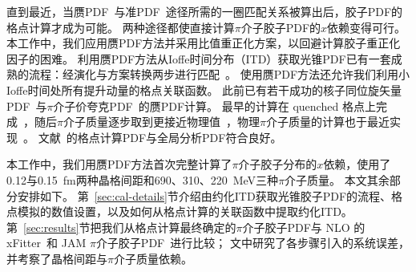 直到最近，当赝PDF~\cite{Balitsky:2019krf}与准PDF~\cite{Zhang:2018diq,Wang:2019tgg}途径所需的一圈匹配关系被算出后，胶子PDF的格点计算才成为可能。
两种途径都使直接计算$\pi$介子胶子PDF的$x$依赖变得可行。
本工作中，我们应用赝PDF方法并采用比值重正化方案，以回避计算胶子重正化因子的困难。
利用赝PDF方法从Ioffe时间分布（ITD）获取光锥PDF已有一套成熟的流程：经演化与方案转换两步进行匹配~\cite{Radyushkin:2018cvn}。
使用赝PDF方法还允许我们利用小Ioffe时间处所有提升动量的格点关联函数。
此前已有若干成功的核子同位旋矢量
PDF~\cite{Orginos:2017kos,Joo:2019jct,Joo:2020spy,Bhat:2020ktg}与$\pi$介子价夸克PDF~\cite{Joo:2019bzr}的赝PDF计算。
最早的计算在 quenched 格点上完成~\cite{Orginos:2017kos}，随后$\pi$介子质量逐步取到更接近物理值~\cite{Joo:2019jct,Joo:2019bzr,Joo:2020spy}，物理$\pi$介子质量的计算也于最近实现~\cite{Bhat:2020ktg}。
文献~\cite{Joo:2019jct,Joo:2019bzr,Joo:2020spy,Bhat:2020ktg}的格点计算PDF与全局分析PDF符合良好。

本工作中，我们用赝PDF方法首次完整计算了$\pi$介子胶子分布的$x$依赖，使用了0.12与0.15~fm两种晶格间距和690、310、220~MeV三种$\pi$介子质量。
本文其余部分安排如下。
第~\ref{sec:cal-details}节介绍由约化ITD获取光锥胶子PDF的流程、格点模拟的数值设置，以及如何从格点计算的关联函数中提取约化ITD。
第~\ref{sec:results}节把我们从格点计算最终确定的$\pi$介子胶子PDF与 NLO 的 xFitter~\cite{Novikov:2020snp}和 JAM $\pi$介子胶子PDF~\cite{Barry:2018ort,Cao:2021aci}进行比较；
文中研究了各步骤引入的系统误差，并考察了晶格间距与$\pi$介子质量依赖。

